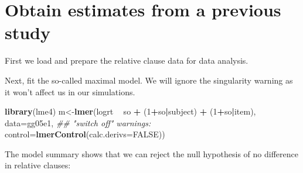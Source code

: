 \documentclass[12pt,]{krantz}
\newenvironment{Shaded}{\begin{snugshade}}{\end{snugshade}}
\newcommand{\CommentTok}[1]{\textcolor[rgb]{0.56,0.35,0.01}{\textit{#1}}}
\newcommand{\DataTypeTok}[1]{\textcolor[rgb]{0.13,0.29,0.53}{#1}}
\newcommand{\DecValTok}[1]{\textcolor[rgb]{0.00,0.00,0.81}{#1}}
\newcommand{\KeywordTok}[1]{\textcolor[rgb]{0.13,0.29,0.53}{\textbf{#1}}}
\newcommand{\NormalTok}[1]{#1}
\newcommand{\OperatorTok}[1]{\textcolor[rgb]{0.81,0.36,0.00}{\textbf{#1}}}
\newcommand{\OtherTok}[1]{\textcolor[rgb]{0.56,0.35,0.01}{#1}}
\newcommand{\StringTok}[1]{\textcolor[rgb]{0.31,0.60,0.02}{#1}}
\begin{document}
\hypertarget{obtain-estimates-from-a-previous-study}{%
\section{Obtain estimates from a previous study}\label{obtain-estimates-from-a-previous-study}}

First we load and prepare the relative clause data for data analysis.

\begin{Shaded}
\end{Shaded}

Next, fit the so-called maximal model. We will ignore the singularity warning as it won't affect us in our simulations.

\begin{Shaded}
\begin{Highlighting}[]
\KeywordTok{library}\NormalTok{(lme4)}
\NormalTok{m<-}\KeywordTok{lmer}\NormalTok{(logrt }\OperatorTok{~}\StringTok{ }\NormalTok{so }\OperatorTok{+}\StringTok{ }
\StringTok{          }\NormalTok{(}\DecValTok{1}\OperatorTok{+}\NormalTok{so}\OperatorTok{|}\NormalTok{subject) }\OperatorTok{+}\StringTok{ }
\StringTok{          }\NormalTok{(}\DecValTok{1}\OperatorTok{+}\NormalTok{so}\OperatorTok{|}\NormalTok{item), }
        \DataTypeTok{data=}\NormalTok{gg05e1,}
        \CommentTok{## "switch off" warnings:}
        \DataTypeTok{control=}\KeywordTok{lmerControl}\NormalTok{(}\DataTypeTok{calc.derivs=}\OtherTok{FALSE}\NormalTok{))}
\end{Highlighting}
\end{Shaded}

The model summary shows that we can reject the null hypothesis of no difference in relative clauses:

\begin{Shaded}
\end{Shaded}
\end{document}
